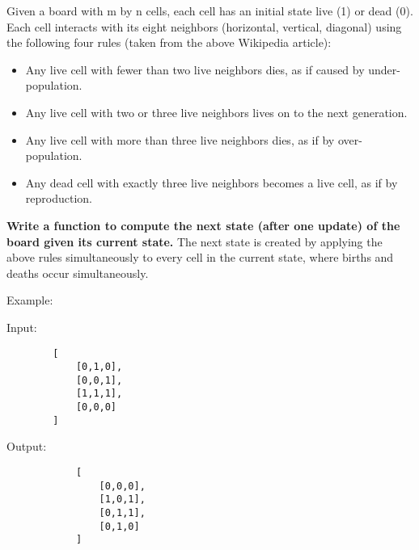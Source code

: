 \documentclass[12pt]{article}
\begin{document}
Given a board with m by n cells, each cell has an initial state live (1) or dead (0). Each cell interacts with its eight neighbors (horizontal, vertical, diagonal) using the following four rules (taken from the above Wikipedia article):

\begin{itemize}
    \item Any live cell with fewer than two live neighbors dies, as if caused by under-population.
    \item Any live cell with two or three live neighbors lives on to the next generation.
    \item Any live cell with more than three live neighbors dies, as if by over-population.
    \item Any dead cell with exactly three live neighbors becomes a live cell, as if by reproduction.
\end{itemize}

\textbf{Write a function to compute the next state (after one update) of the board given its current state.} The next state is created by applying the above rules simultaneously to every cell in the current state, where births and deaths occur simultaneously.

Example:

\begin{minipage}{.5\textwidth}
  Input: 
    \begin{verbatim}
        [
            [0,1,0],
            [0,0,1],
            [1,1,1],
            [0,0,0]
        ]
    \end{verbatim}
\end{minipage}%
\begin{minipage}{.5\textwidth}
Output: 
    \begin{verbatim}
            [
                [0,0,0],
                [1,0,1],
                [0,1,1],
                [0,1,0]
            ]
    \end{verbatim}
\end{minipage}
\end{document}
